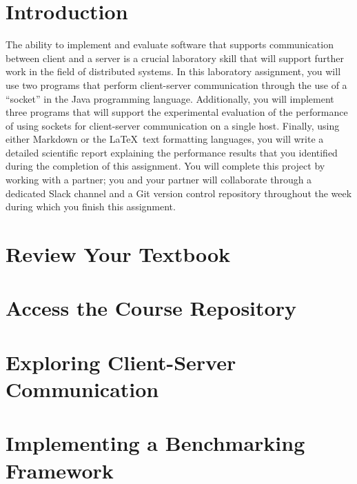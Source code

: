 


\usepackage[compact]{titlesec}



\section*{Introduction}

The ability to implement and evaluate software that supports communication between client and a server is a crucial
laboratory skill that will support further work in the field of distributed systems. In this laboratory assignment, you
will use two programs that perform client-server communication through the use of a ``socket'' in the Java programming
language. Additionally, you will implement three programs that will support the experimental evaluation of the
performance of using sockets for client-server communication on a single host. Finally, using either Markdown or the
\LaTeX~text formatting languages, you will write a detailed scientific report explaining the performance results that
you identified during the completion of this assignment. You will complete this project by working with a partner; you
and your partner will collaborate through a dedicated Slack channel and a Git version control repository throughout the
week during which you finish this assignment.

\section*{Review Your Textbook}



\section*{Access the Course Repository}



\section*{Exploring Client-Server Communication}



\section*{Implementing a Benchmarking Framework}



